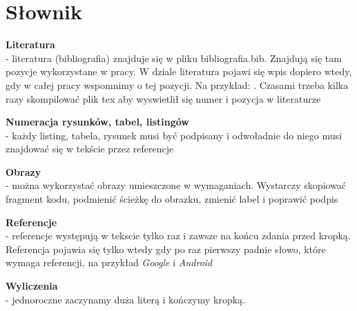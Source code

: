 \thispagestyle{empty}
\section*{Słownik}\label{sec:slownik}

\begin{description}
\item \textbf{Literatura} \\
- literatura (bibliografia) znajduje się w pliku bibliografia.bib. Znajdują się tam pozycje wykorzystane w pracy. W dziale literatura pojawi się wpis dopiero wtedy, gdy w całej pracy wspomnimy o tej pozycji. Na przykład:
\cite[s.\pageref{sec:literatura}]{book:helloandroid}. Czasami trzeba kilka razy skompilować plik tex aby wyswietlił się numer i pozycja w literaturze

\item \textbf{Numeracja rysunków, tabel, listingów} \\
- każdy listing, tabela, rysunek musi być podpisany i odwoładnie do niego musi znajdować się w tekście przez referencje

\item \textbf{Obrazy} \\
- można wykorzystać obrazy umieszczone w wymaganiach. Wystarczy skopiować fragment kodu, podmienić ścieżkę do obrazku, zmienić label i poprawić podpis

\item \textbf{Referencje} \\
- referencje występują w tekscie tylko raz i zawsze na końcu zdania przed kropką. Referencja pojawia się tylko wtedy gdy po raz pierwszy padnie słowo, które wymaga referencji, na przykład \emph{Google} i \emph{Android} \cite[s.\pageref{sec:referencje}]{google,android}

\item \textbf{Wyliczenia} \\
- jednoroczne zaczynamy duża literą i kończymy kropką.

\end{description}

